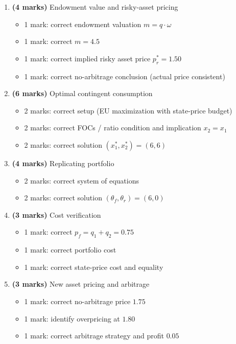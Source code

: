 \documentclass[12pt]{article}
\begin{document}
\begin{enumerate}[label=(\alph*)]
\item \textbf{(4 marks)} Endowment value and risky-asset pricing
\begin{itemize}
\item 1 mark: correct endowment valuation \(m=q\cdot\omega\)
\item 1 mark: correct \(m=4.5\)
\item 1 mark: correct implied risky asset price \(p_r^*=1.50\)
\item 1 mark: correct no-arbitrage conclusion (actual price consistent)
\end{itemize}

\item \textbf{(6 marks)} Optimal contingent consumption
\begin{itemize}
\item 2 marks: correct setup (EU maximization with state-price budget)
\item 2 marks: correct FOCs / ratio condition and implication \(x_2=x_1\)
\item 2 marks: correct solution \(\boxed{(x_1^*,x_2^*)=(6,6)}\)
\end{itemize}

\item \textbf{(4 marks)} Replicating portfolio
\begin{itemize}
\item 2 marks: correct system of equations
\item 2 marks: correct solution \(\boxed{(\theta_f,\theta_r)=(6,0)}\)
\end{itemize}

\item \textbf{(3 marks)} Cost verification
\begin{itemize}
\item 1 mark: correct \(p_f=q_1+q_2=0.75\)
\item 1 mark: correct portfolio cost
\item 1 mark: correct state-price cost and equality
\end{itemize}

\item \textbf{(3 marks)} New asset pricing and arbitrage
\begin{itemize}
\item 1 mark: correct no-arbitrage price \(\boxed{1.75}\)
\item 1 mark: identify overpricing at \(1.80\)
\item 1 mark: correct arbitrage strategy and profit \(\boxed{0.05}\)
\end{itemize}
\end{enumerate}
\end{document}
